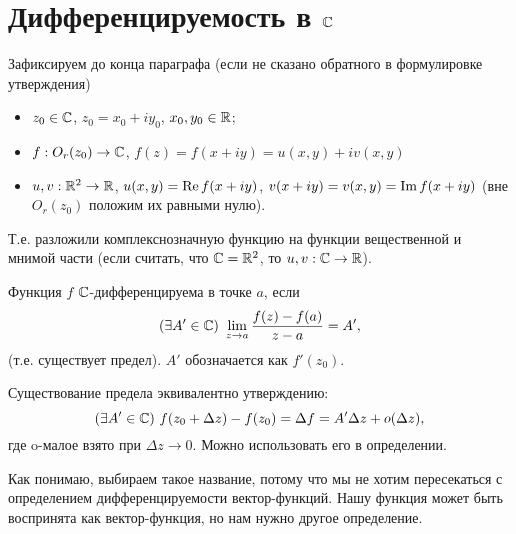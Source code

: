 \section{Дифференцируемость в $\mathbb{C}$}

Зафиксируем до конца параграфа (если не сказано обратного в формулировке утверждения)
\begin{itemize}
	\item $z_0 \in \mathbb{C}$, $z_0 = x_0 + i y_0$, $x_0, y_0 \in \mathbb{R}$;
	\item $f: O_r(z_0) \to \mathbb{C}$, $f(z) = f(x + iy) = u(x, y) + i v(x, y)$
	\item $u, v: \mathbb{R}^2 \to \mathbb{R}$, $u(x, y) = \operatorname{Re} f(x + i y)$, $v(x + iy) = v(x, y) = \operatorname{Im} f(x + i y)$ (вне $O_r(z_0)$ положим их равными нулю).
\end{itemize}
Т.е. разложили комплекснозначную функцию на функции вещественной и мнимой части (если считать, что $\mathbb{C} = \mathbb{R}^2$, то $u, v: \mathbb{C} \to \mathbb{R}$).

\begin{definition}
	Функция $f$ $\mathbb{C}$-дифференцируема в точке $a$, если
	\[
	(\exists A' \in \mathbb{C}) \,\, \lim\limits_{z \to a} \frac{f(z) - f(a)}{z - a} = A',
	\]
	(т.е. существует предел). $A'$ обозначается как $f'(z_0)$.
\end{definition}
\begin{note}
	Существование предела эквивалентно утверждению:
	\[
		(\exists A' \in \mathbb{C}) \,\, f(z_0 + \Delta z) - f(z_0) = \Delta f = A' \Delta z + o(\Delta z),
	\]
	где o-малое взято при $\Delta z \to 0$. Можно использовать его в определении.	
\end{note}
\begin{anote}
	Как понимаю, выбираем такое название, потому что мы не хотим пересекаться с определением дифференцируемости вектор-функций. Нашу функция может быть воспринята как вектор-функция, но нам нужно другое определение.
\end{anote}


